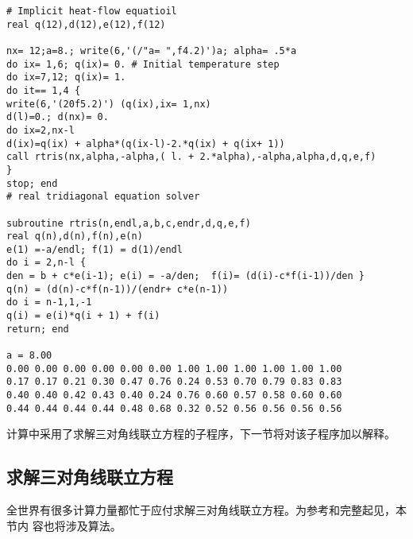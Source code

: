 \begin{verbatim}
# Implicit heat-flow equatioil 
real q(12),d(12),e(12),f(12)

nx= 12;a=8.; write(6,'(/"a= ",f4.2)')a; alpha= .5*a 
do ix= 1,6; q(ix)= 0. # Initial temperature step
do ix=7,12; q(ix)= 1. 
do it== 1,4 {
write(6,'(20f5.2)') (q(ix),ix= 1,nx) 
d(l)=0.; d(nx)= 0. 
do ix=2,nx-l
d(ix)=q(ix) + alpha*(q(ix-l)-2.*q(ix) + q(ix+ 1)) 
call rtris(nx,alpha,-alpha,( l. + 2.*alpha),-alpha,alpha,d,q,e,f)
}
stop; end 
# real tridiagonal equation solver

subroutine rtris(n,endl,a,b,c,endr,d,q,e,f) 
real q(n),d(n),f(n),e(n)
e(1) =-a/endl; f(1) = d(1)/endl
do i = 2,n-l {
den = b + c*e(i-1); e(i) = -a/den;  f(i)= (d(i)-c*f(i-1))/den } 
q(n) = (d(n)-c*f(n-1))/(endr+ c*e(n-1))
do i = n-1,1,-1
q(i) = e(i)*q(i + 1) + f(i) 
return; end

a = 8.00
0.00 0.00 0.00 0.00 0.00 0.00 1.00 1.00 1.00 1.00 1.00 1.00
0.17 0.17 0.21 0.30 0.47 0.76 0.24 0.53 0.70 0.79 0.83 0.83
0.40 0.40 0.42 0.43 0.40 0.24 0.76 0.60 0.57 0.58 0.60 0.60 
0.44 0.44 0.44 0.44 0.48 0.68 0.32 0.52 0.56 0.56 0.56 0.56
\end{verbatim}
计算中采用了求解三对角线联立方程的子程序，下一节将对该子程序加以解释。
\subsection{求解三对角线联立方程}
全世界有很多计算力量都忙于应付求解三对角线联立方程。为参考和完整起见，本节内
容也将涉及算法。

